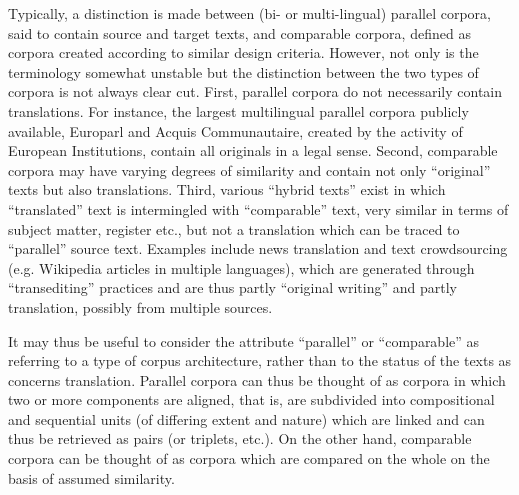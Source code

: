 \documentclass[output=paper]{LSP/langsci}
\begin{document}
Typically, a distinction is made between (bi- or multi-lingual) parallel corpora, said to contain source and target texts, and comparable corpora, defined as corpora created according to similar design criteria. However, not only is the terminology somewhat unstable \citep[149]{Zanettin2012} but the distinction between the two types of corpora is not always clear cut. First, parallel corpora do not necessarily contain translations. For instance, the largest multilingual parallel corpora publicly available, Europarl and Acquis Communautaire, created by the activity of European Institutions, contain all originals in a legal sense. Second, comparable corpora may have varying degrees of similarity and contain not only “original” texts but also translations. Third, various “hybrid texts” exist in which “translated” text is intermingled with “comparable” text, very similar in terms of subject matter, register etc., but not a translation which can be traced to “parallel” source text. Examples include news translation and text crowdsourcing (e.g. Wikipedia articles in multiple languages), which are generated through “transediting” \citep{Stetting1989} practices and are thus partly “original writing” and partly translation, possibly from multiple sources. 

It may thus be useful to consider the attribute “parallel” or “comparable” as referring to a type of corpus architecture, rather than to the status of the texts as concerns translation. Parallel corpora can thus be thought of as corpora in which two or more components are aligned, that is, are subdivided into compositional and sequential units (of differing extent and nature) which are linked and can thus be retrieved as pairs (or triplets, etc.). On the other hand, comparable corpora can be thought of as corpora which are compared on the whole on the basis of assumed similarity. \enlargethispage{1\baselineskip}
\end{document}
